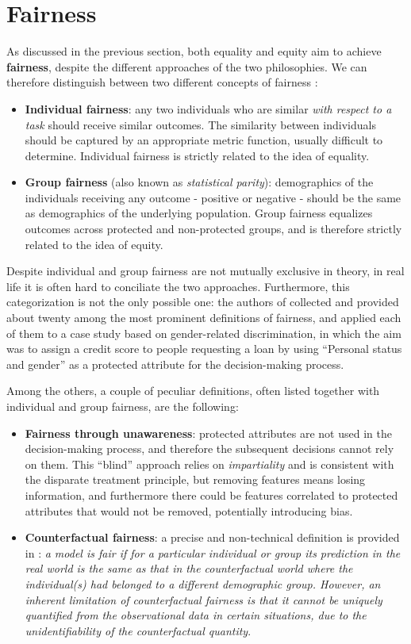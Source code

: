 \section{Fairness}
As discussed in the previous section, both equality and equity aim to achieve \textbf{fairness}, despite the different approaches of the two philosophies. We can therefore distinguish between two different concepts of fairness \cite{dwork2012fairness}:
\begin{itemize}
\item \textbf{Individual fairness}: any two individuals who are similar \textit{with respect to a task} should receive similar outcomes. The similarity between individuals should be captured by an appropriate metric function, usually difficult to determine. Individual fairness is strictly related to the idea of equality.
\item \textbf{Group fairness} (also known as \textit{statistical parity}): demographics of the individuals receiving any outcome - positive or negative - should be the same as demographics of the underlying population. Group fairness equalizes outcomes across protected and non-protected groups, and is therefore strictly related to the idea of equity.
\end{itemize}

Despite individual and group fairness are not mutually exclusive in theory, in real life it is often hard to conciliate the two approaches. Furthermore, this categorization is not the only possible one: the authors of \cite{verma2018fairness} collected and provided about twenty among the most prominent definitions of fairness, and applied each of them to a case study based on gender-related discrimination, in which the aim was to assign a credit score to people requesting a loan by using ``Personal status and gender'' as a protected attribute for the decision-making process.

Among the others, a couple of peculiar definitions, often listed together with individual and group fairness, are the following:
\begin{itemize}
\item \textbf{Fairness through unawareness}: protected attributes are not used in the decision-making process, and therefore the subsequent decisions cannot rely on them. This ``blind'' approach relies on \textit{impartiality} and is consistent with the disparate treatment principle, but removing features means losing information, and furthermore there could be features correlated to protected attributes that would not be removed, potentially introducing bias.
\item \textbf{Counterfactual fairness}: a precise and non-technical definition is provided in \cite[p.1]{wu2019counterfactual}: \emph{a model is fair if for a particular individual or group its prediction in the real world is the same as that in the counterfactual world where the individual(s) had belonged to a different demographic group. However, an inherent limitation of counterfactual fairness is that it cannot be uniquely quantified from the observational data in certain situations, due to the unidentifiability of the counterfactual quantity}.
\end{itemize}

